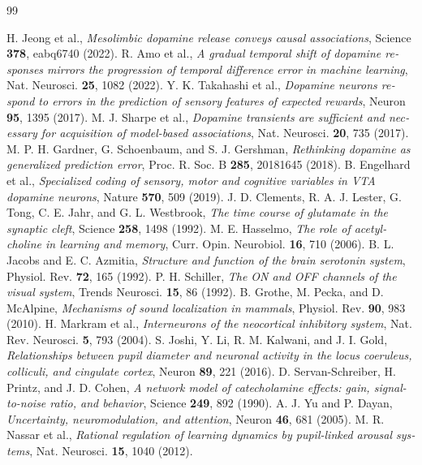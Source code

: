 \begin{thebibliography}{99}
\begin{otherlanguage}{english}
 H. Jeong et al., \emph{Mesolimbic dopamine release conveys causal associations}, Science \textbf{378}, eabq6740 (2022).
 R. Amo et al., \emph{A gradual temporal shift of dopamine responses mirrors the progression of temporal difference error in machine learning}, Nat. Neurosci. \textbf{25}, 1082 (2022).
 Y. K. Takahashi et al., \emph{Dopamine neurons respond to errors in the prediction of sensory features of expected rewards}, Neuron \textbf{95}, 1395 (2017).
 M. J. Sharpe et al., \emph{Dopamine transients are sufficient and necessary for acquisition of model-based associations}, Nat. Neurosci. \textbf{20}, 735 (2017).
 M. P. H. Gardner, G. Schoenbaum, and S. J. Gershman, \emph{Rethinking dopamine as generalized prediction error}, Proc. R. Soc. B \textbf{285}, 20181645 (2018).
 B. Engelhard et al., \emph{Specialized coding of sensory, motor and cognitive variables in VTA dopamine neurons}, Nature \textbf{570}, 509 (2019).
 J. D. Clements, R. A. J. Lester, G. Tong, C. E. Jahr, and G. L. Westbrook, \emph{The time course of glutamate in the synaptic cleft}, Science \textbf{258}, 1498 (1992).
 M. E. Hasselmo, \emph{The role of acetylcholine in learning and memory}, Curr. Opin. Neurobiol. \textbf{16}, 710 (2006).
 B. L. Jacobs and E. C. Azmitia, \emph{Structure and function of the brain serotonin system}, Physiol. Rev. \textbf{72}, 165 (1992).
 P. H. Schiller, \emph{The ON and OFF channels of the visual system}, Trends Neurosci. \textbf{15}, 86 (1992).
 B. Grothe, M. Pecka, and D. McAlpine, \emph{Mechanisms of sound localization in mammals}, Physiol. Rev. \textbf{90}, 983 (2010).
 H. Markram et al., \emph{Interneurons of the neocortical inhibitory system}, Nat. Rev. Neurosci. \textbf{5}, 793 (2004).
 S. Joshi, Y. Li, R. M. Kalwani, and J. I. Gold, \emph{Relationships between pupil diameter and neuronal activity in the locus coeruleus, colliculi, and cingulate cortex}, Neuron \textbf{89}, 221 (2016).
 D. Servan-Schreiber, H. Printz, and J. D. Cohen, \emph{A network model of catecholamine effects: gain, signal-to-noise ratio, and behavior}, Science \textbf{249}, 892 (1990).
 A. J. Yu and P. Dayan, \emph{Uncertainty, neuromodulation, and attention}, Neuron \textbf{46}, 681 (2005).
 M. R. Nassar et al., \emph{Rational regulation of learning dynamics by pupil-linked arousal systems}, Nat. Neurosci. \textbf{15}, 1040 (2012).

\end{otherlanguage}
\end{thebibliography}
